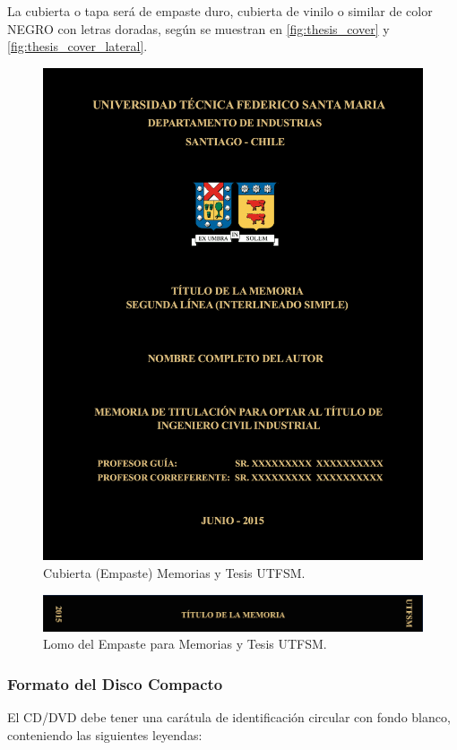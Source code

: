 La cubierta o tapa será de empaste duro, cubierta de vinilo o similar de color NEGRO con letras doradas, según se muestran en \autoref{fig:thesis_cover} y \autoref{fig:thesis_cover_lateral}.
\begin{figure}[ht!]
\centering
\includegraphics[width=.7\textwidth]{figures/thesis_cover.png}
\caption{Cubierta (Empaste) Memorias y Tesis UTFSM.}
\label{fig:thesis_cover}
\end{figure}

\begin{figure}[ht!]
\centering
\includegraphics[width=.7\textwidth]{figures/thesis_cover_lateral.png}
\caption{Lomo del Empaste para Memorias y Tesis UTFSM.}
\label{fig:thesis_cover_lateral}
\end{figure}

\subsubsection{Formato del Disco Compacto}

El CD/DVD debe tener una carátula de identificación circular con fondo blanco, conteniendo las siguientes leyendas:

